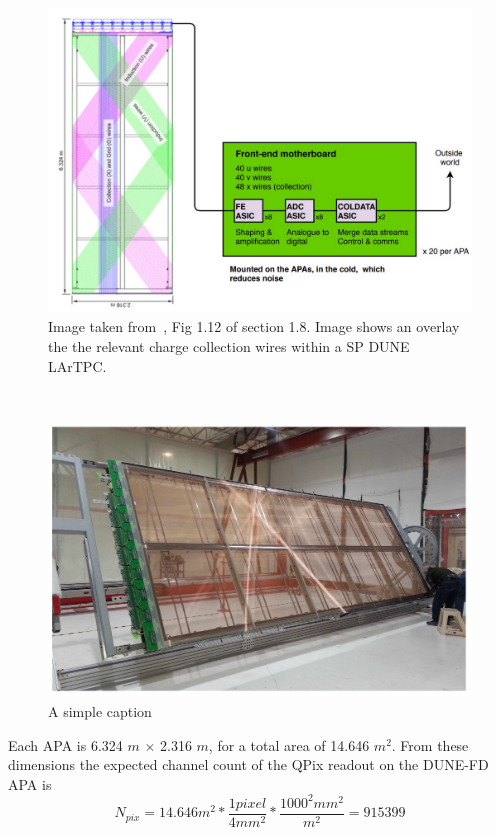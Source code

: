 \begin{figure}[]
\centering
\includegraphics[width=\textwidth]{images/dune_apa_motherboards.jpg}
\caption{Image taken from~\citep{DUNE-FD_TDRv4:Abi_2020}, Fig 1.12 of section 1.8. Image shows an overlay the the relevant charge collection wires within a SP DUNE LArTPC.}
\end{figure}~\label{fig:dune_tpc_electronics}

\begin{figure}[]
\centering
\includegraphics[width=\textwidth]{images/dune_fd_tdr_apa_image.jpg}
\caption{A simple caption \citep{DUNE-FD_TDRv4:Abi_2020}}
\end{figure}

Each APA is 6.324 $\unit{m}$ $\times$ 2.316 $\unit{m}$, for a total area of 14.646 $\unit{m^{2}}$.
From these dimensions the expected channel count of the QPix readout on the DUNE-FD APA is
\begin{equation}
  N_{pix} = 14.646 m^{2} * \frac{1 pixel}{4 mm^{2}} * \frac{ 1000^{2} mm^{2} }{m^{2}} = 915399
\end{equation}

